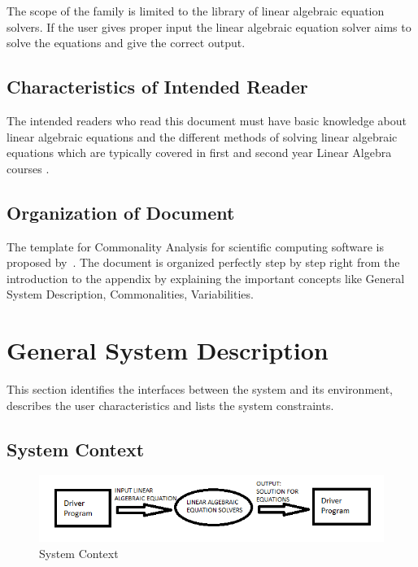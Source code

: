 \documentclass[12pt]{article}
\begin{document}
The scope of the family is limited to the library of linear algebraic equation
solvers. If the user gives proper input the linear algebraic equation solver
aims to solve the equations and give the correct output.

\subsection{Characteristics of Intended Reader} 

The intended readers who read this document must have basic knowledge about
linear algebraic equations and the different methods of solving linear algebraic
equations which are typically covered in first and second year Linear Algebra
courses . 

\subsection{Organization of Document}

The template for Commonality Analysis for scientific computing software is
proposed by~\cite{smith2006systematic}. The document is organized perfectly step
by step right from the introduction to the appendix by explaining the important
concepts like General System Description, Commonalities, Variabilities.

\section{General System Description}

This section identifies the interfaces between the system and its environment,
describes the user characteristics and lists the system constraints.

\subsection{System Context}

\begin{figure}[h]
\centering
\includegraphics[scale= .7]{diagram1}
\caption{System Context}
\end{figure}
\end{document}
